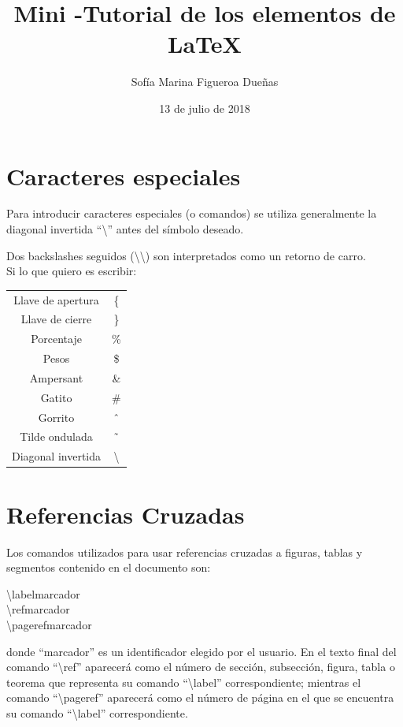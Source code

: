 \documentclass{article}
\title{Mini -Tutorial de los elementos de \LaTeX}
\author{Sof\'ia Marina Figueroa Due\~nas}
\date{13 de julio de 2018}
\begin{document}
  
\maketitle 
\newpage
\tableofcontents
\newpage
\section{Caracteres especiales}
\label{sec:car_es}
Para introducir caracteres especiales (o comandos) se utiliza generalmente la diagonal invertida ``\textbackslash'' antes del s\'imbolo deseado.

Dos backslashes seguidos (\textbackslash \textbackslash) son interpretados como un retorno de carro. \\Si lo que quiero es escribir:\\
\begin{tabular}{c c}
Llave de apertura 	& \{	\\
Llave de cierre		& \}	\\
Porcentaje			& \%	\\
Pesos				& \$	\\
Ampersant			& \&	\\
Gatito				& \#	\\
Gorrito				& \^\	\\
Tilde ondulada		& \~\	\\
Diagonal invertida	& \textbackslash	\\
\end{tabular}


\section{Referencias Cruzadas}
Los comandos utilizados para usar referencias cruzadas a figuras, tablas y segmentos 
contenido en el documento son:


\begin{center}
\textbackslash label{marcador}\\
\textbackslash ref{marcador}\\
\textbackslash pageref{marcador}
\end{center}



donde ``marcador'' es un identificador elegido por el usuario. En el texto final del comando
``\textbackslash ref'' aparecer\'a como el n\'umero de secci\'on, subsecci\'on, figura, tabla o teorema
que representa su comando ``\textbackslash label'' correspondiente; mientras el comando
``\textbackslash pageref'' aparecer\'a como el n\'umero de p\'agina en el que se encuentra su comando
``\textbackslash label'' correspondiente.\\
\end{document}
